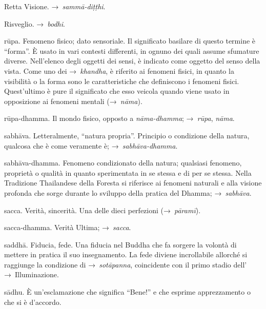 \begin{glossarydescription}

\item[Retta Visione.] →~\emph{sammā-diṭṭhi}.

\item[Risveglio.] →~\emph{bodhi}.

\item[rūpa.] Fenomeno fisico; dato sensoriale. Il significato basilare di
  questo termine è ``forma''. È usato in vari contesti differenti, in ognuno dei
  quali assume sfumature diverse. Nell'elenco degli oggetti dei sensi, è
  indicato come oggetto del senso della vista. Come uno dei →~\emph{khandha}, è
  riferito ai fenomeni fisici, in quanto la visibilità o la forma sono le
  caratteristiche che definiscono i fenomeni fisici. Quest'ultimo è pure il
  significato che esso veicola quando viene usato in opposizione ai fenomeni
  mentali (→~\emph{nāma}).

\item[rūpa-dhamma.] Il mondo fisico, opposto a \emph{nāma-dhamma};
  →~\emph{rūpa}, \emph{nāma}.


\item[sabhāva.] Letteralmente, ``natura propria''. Principio o condizione
  della natura, qualcosa che è come veramente è; →~\emph{sabhāva-dhamma}.

\item[sabhāva-dhamma.] Fenomeno condizionato della natura; qualsiasi
  fenomeno, proprietà o qualità in quanto sperimentata in se stessa e di per se
  stessa. Nella Tradizione Thailandese della Foresta si riferisce ai fenomeni
  naturali e alla visione profonda che sorge durante lo sviluppo della pratica
  del Dhamma; →~\emph{sabhāva}.

\item[sacca.] Verità, sincerità. Una delle dieci perfezioni
  (→~\emph{pāramī}).

\item[sacca-dhamma.] Verità Ultima; →~\emph{sacca}.

\item[saddhā.] Fiducia, fede. Una fiducia nel Buddha che fa sorgere la
  volontà di mettere in pratica il suo insegnamento. La fede diviene
  incrollabile allorché si raggiunge la condizione di →~\emph{sotāpanna},
  coincidente con il primo stadio dell' →~Illuminazione.

\item[sādhu.] È un'esclamazione che significa ``Bene!'' e che esprime
  apprezzamento o che si è d'accordo.


\end{glossarydescription}
